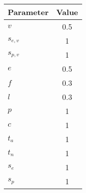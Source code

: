 \begin{tabular}[t]{lc}
\toprule
Parameter & Value \\
\midrule
$v$ & 0.5 \\
$s_{e,v}$ & 1 \\
$s_{p,v}$ & 1 \\
$e$     & 0.5 \\
$f$  & 0.3 \\
$l$  & 0.3 \\
$p$ & 1 \\
$c$ & 1 \\
$t_a$ & 1 \\
$t_n$ & 1 \\
$s_e$ & 1 \\
$s_p$ & 1 \\
\bottomrule
\end{tabular}%
